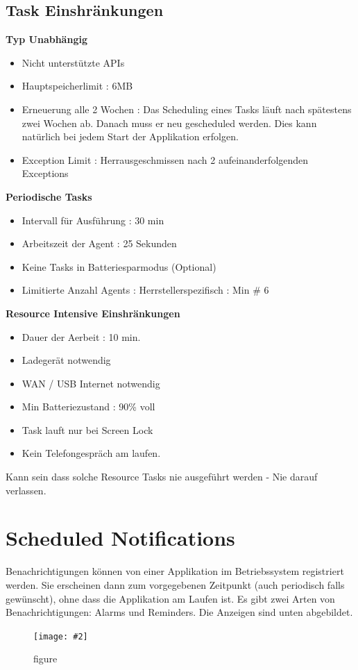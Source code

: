 \documentclass[a4paper,10pt]{scrreprt}
\newcommand{\pic}[2][figure]{\begin{figure}[h]
 \centering
 \texttt{[image: \#2]}
 \caption{#1}
\end{figure}
}
\begin{document}
\subsection{Task Einshränkungen}
\textbf{Typ Unabhängig}
\begin{itemize}
 \item Nicht unterstützte APIs
 \item Hauptspeicherlimit : 6MB
 \item Erneuerung alle 2 Wochen : Das Scheduling eines Tasks läuft nach spätestens zwei Wochen ab.
Danach muss er neu gescheduled werden. Dies kann natürlich bei jedem Start der Applikation erfolgen.
\item Exception Limit : Herrausgeschmissen nach 2 aufeinanderfolgenden Exceptions
\end{itemize}
\textbf{Periodische Tasks}
\begin{itemize}
 \item Intervall für Ausführung : 30 min 
 \item Arbeitszeit der Agent : 25 Sekunden
 \item Keine Tasks in Batteriesparmodus (Optional)
 \item Limitierte Anzahl Agents : Herrstellerspezifisch : Min \# 6
\end{itemize}
\textbf{Resource Intensive Einshränkungen}
\begin{itemize}
 \item Dauer der Aerbeit : 10 min. 
 \item Ladegerät notwendig
 \item WAN /  USB Internet notwendig
 \item Min Batteriezustand : 90\% voll
 \item Task lauft nur bei Screen Lock
 \item Kein Telefongespräch am laufen.
\end{itemize}
Kann sein dass solche Resource Tasks nie ausgeführt werden - Nie darauf verlassen.

\section{Scheduled Notifications}
Benachrichtigungen können von einer Applikation im Betriebssystem registriert werden. Sie erscheinen dann
zum vorgegebenen Zeitpunkt (auch periodisch falls gewünscht), ohne dass die Applikation am Laufen ist. Es gibt
zwei Arten von Benachrichtigungen: Alarms und Reminders. Die Anzeigen sind unten abgebildet.
\pic{sn.png}
\end{document}
